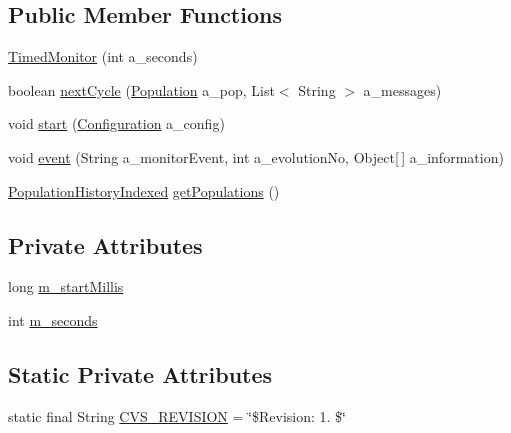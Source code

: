 \subsection*{Public Member Functions}
\begin{DoxyCompactItemize}
\item 
\hyperlink{classorg_1_1jgap_1_1audit_1_1_timed_monitor_ab97d1a1199af731169ab829819d5591f}{Timed\-Monitor} (int a\-\_\-seconds)
\item 
boolean \hyperlink{classorg_1_1jgap_1_1audit_1_1_timed_monitor_afa628c8196fb0b8284534b5503ebacf1}{next\-Cycle} (\hyperlink{classorg_1_1jgap_1_1_population}{Population} a\-\_\-pop, List$<$ String $>$ a\-\_\-messages)
\item 
void \hyperlink{classorg_1_1jgap_1_1audit_1_1_timed_monitor_a41c579ad3f3e15ccfece260de6090503}{start} (\hyperlink{classorg_1_1jgap_1_1_configuration}{Configuration} a\-\_\-config)
\item 
void \hyperlink{classorg_1_1jgap_1_1audit_1_1_timed_monitor_a5323fa804c8e89f77f44dbe55b7133bb}{event} (String a\-\_\-monitor\-Event, int a\-\_\-evolution\-No, Object\mbox{[}$\,$\mbox{]} a\-\_\-information)
\item 
\hyperlink{classorg_1_1jgap_1_1eval_1_1_population_history_indexed}{Population\-History\-Indexed} \hyperlink{classorg_1_1jgap_1_1audit_1_1_timed_monitor_a8023d29410bf7317676757012eaec7b3}{get\-Populations} ()
\end{DoxyCompactItemize}
\subsection*{Private Attributes}
\begin{DoxyCompactItemize}
\item 
long \hyperlink{classorg_1_1jgap_1_1audit_1_1_timed_monitor_af527bd593ba14f8c8d55d82e54212d1e}{m\-\_\-start\-Millis}
\item 
int \hyperlink{classorg_1_1jgap_1_1audit_1_1_timed_monitor_a195eef87bf3426669b3bf8e8660707e7}{m\-\_\-seconds}
\end{DoxyCompactItemize}
\subsection*{Static Private Attributes}
\begin{DoxyCompactItemize}
\item 
static final String \hyperlink{classorg_1_1jgap_1_1audit_1_1_timed_monitor_a9302a98eb4a32d7f0b357cba2df06682}{C\-V\-S\-\_\-\-R\-E\-V\-I\-S\-I\-O\-N} = \char`\"{}\$Revision\-: 1. \$\char`\"{}
\end{DoxyCompactItemize}
